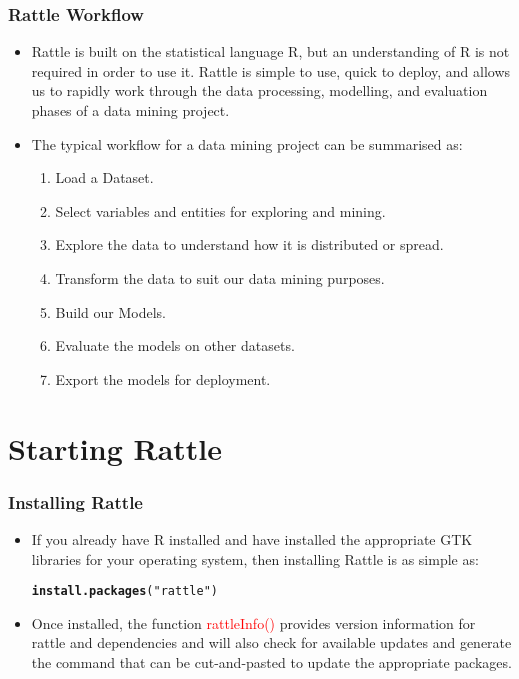 \documentclass{beamer}\usepackage[]{graphicx}\usepackage[]{color}
\makeatletter
\newcommand{\hlstr}[1]{\textcolor[rgb]{0.192,0.494,0.8}{#1}}%
\newcommand{\hlstd}[1]{\textcolor[rgb]{0.345,0.345,0.345}{#1}}%
\newcommand{\hlkwd}[1]{\textcolor[rgb]{0.737,0.353,0.396}{\textbf{#1}}}%
\newenvironment{kframe}{%
 \def\at@end@of@kframe{}%
 \ifinner\ifhmode%
  \def\at@end@of@kframe{\end{minipage}}%
  \begin{minipage}{\columnwidth}%
 \fi\fi%
 \def\FrameCommand##1{\hskip\@totalleftmargin \hskip-\fboxsep
 \colorbox{shadecolor}{##1}\hskip-\fboxsep
     \hskip-\linewidth \hskip-\@totalleftmargin \hskip\columnwidth}%
 \MakeFramed {\advance\hsize-\width
   \@totalleftmargin\z@ \linewidth\hsize
   \@setminipage}}%
 {\par\unskip\endMakeFramed%
 \at@end@of@kframe}
\newenvironment{knitrout}{}{} %
\makeatother
\begin{document}
\begin{frame}
\frametitle{Rattle Workflow}
\begin{itemize}
\item Rattle is built on the statistical language R, but an understanding of R is not required in order to use it. Rattle is simple to use, quick to deploy, and allows us to rapidly work through the data processing, modelling, and evaluation phases of a data mining project.
\item The typical workflow for a data mining project can be summarised as:
  \begin{enumerate}
  \item Load a Dataset.
  \item Select variables and entities for exploring and mining.
  \item Explore the data to understand how it is distributed or spread.
  \item Transform the data to suit our data mining purposes.
  \item Build our Models.
  \item Evaluate the models on other datasets.
  \item Export the models for deployment.
  \end{enumerate}
\end{itemize}
\end{frame}

\section{Starting Rattle}
\begin{frame}[fragile]
\frametitle{Installing Rattle}
\begin{itemize}
\item If you already have R installed and have installed the appropriate GTK libraries for your operating system, then installing Rattle is as simple as:
\begin{knitrout}
\color{fgcolor}\begin{kframe}
\begin{alltt}
\hlkwd{install.packages}\hlstd{(}\hlstr{"rattle"}\hlstd{)}
\end{alltt}
\end{kframe}
\end{knitrout}
\item Once installed, the function \textcolor{red}{rattleInfo()} provides version information for rattle and dependencies and will also check for available updates and generate the command that can be cut-and-pasted to update the appropriate packages.
\end{itemize}
\end{frame}
\end{document}
